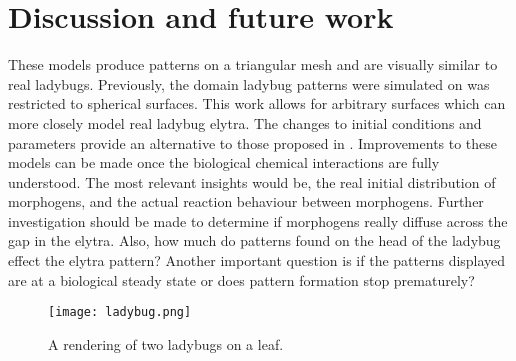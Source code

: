 \section{Discussion and future work}
These models produce patterns on a triangular mesh and are visually similar to real ladybugs. Previously, the domain ladybug patterns were simulated on was restricted to spherical surfaces. This work allows for arbitrary surfaces which can more closely model real ladybug elytra. The changes to initial conditions and parameters provide an alternative to those proposed in \cite{Liaw2001}. Improvements to these models can be made once the biological chemical interactions are fully understood. The most relevant insights would be, the real initial distribution of morphogens, and the actual reaction behaviour between morphogens. Further investigation should be made to determine if morphogens really diffuse across the gap in the elytra. Also, how much do patterns found on the head of the ladybug effect the elytra pattern? Another important question is if the patterns displayed are at a biological steady state or does pattern formation stop prematurely?

\begin{figure}[p]
	\centering
	\texttt{[image: ladybug.png]}
	\caption{A rendering of two ladybugs on a leaf.}
	\label{fig:ladybugRender}
\end{figure}